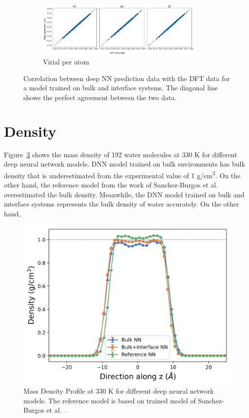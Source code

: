\begin{figure}[tbhp!]
\begin{subfigure}{0.9\textwidth}
    \includegraphics[width=0.9\textwidth]{images/bulk+interface_NN_on_interface/2_virial_peratom.png}
    \caption{Virial per atom}
    \label{fig:corr_bulk+interface_NN_P}
  \end{subfigure}
  \caption{Correlation between deep NN prediction data with the DFT data for
    a
    model trained on bulk and interface systems. The
    diagonal line shows the perfect agreement between the two data.}
  \label{fig:corr_bulk+interface_NN}
\end{figure}

\section{Density}
Figure~\ref{fig:density} shows the mass density of 192 water molecules at 330 K
for different deep neural network models. DNN model trained on bulk
environments has bulk
density that is underestimated from the experimental value of 1 \unit{
  g/cm^3}. On the other hand, the reference model from the work of
Sanchez-Burgos et
al.~\cite{sanchez2023deep}  overestimated the bulk density. Meanwhile,
the DNN model trained on  bulk and interface systems  represents the
bulk density of water accurately. On the other hand,
\begin{figure}[tbhp!]
  \centering
  \includegraphics[width=0.65\linewidth]{images/density_330.png}
  \caption{Mass Density Profile at 330 K for different deep neural network
    models. The reference model is based on trained model of Sanchez-Burgos et
    al.~\cite{sanchez2023deep}. }
  \label{fig:density}
\end{figure}

